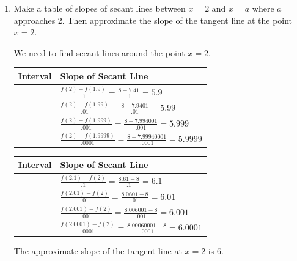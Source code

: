 \documentclass[handout,nooutcomes]{ximera}
\begin{document}
\begin{problem}
\[\begin{array}{lr}
\\

\end{array} \]
	
		\begin{enumerate}
			
		\item  Make a table of slopes of secant lines between $x=2$ and $x=a$ where $a$ approaches 2.  Then approximate the slope of the tangent line at the point $x=2$.
		\begin{freeResponse}		 
		We need to find secant lines around the point $x=2$.
		
			\begin{tabular}{|l|l|}
			\hline
			Interval & Slope of Secant Line  \\
			\hline
			[1.9,2] & $ \frac{f(2)-f(1.9)}{.1}=\frac{8-7.41}{.1}=5.9$  \\
			\hline
			[1.99,2] & $\frac{f(2)-f(1.99)}{.01}=\frac{8-7.9401}{.01}=5.99$  \\
			\hline
			[1.999,2] & $\frac{f(2)-f(1.999)}{.001}=\frac{8-7.994001}{.001}=5.999$  \\
			\hline
			[1.9999,2] & $\frac{f(2)-f(1.9999)}{.0001}=\frac{8-7.99940001}{.0001}=5.9999$  \\
			\hline
			\end{tabular}
			
			\begin{tabular}{|l|l|}
			\hline
			Interval & Slope of Secant Line  \\
			\hline
			[2,2.1] & $ \frac{f(2.1)-f(2)}{.1}=\frac{8.61-8}{.1}=6.1$  \\
			\hline
			[2,2.01] & $\frac{f(2.01)-f(2)}{.01}=\frac{8.0601-8}{.01}=6.01$  \\
			\hline
			[2,2.001] & $\frac{f(2.001)-f(2)}{.001}=\frac{8.006001-8}{.001}=6.001$  \\
			\hline
			[2,2.0001] & $\frac{f(2.0001)-f(2)}{.0001}=\frac{8.00060001-8}{.0001}=6.0001$  \\
			\hline
			\end{tabular}
			
		The approximate slope of the tangent line at $x=2$ is 6.
		\end{freeResponse}
			  

\end{enumerate}
\end{problem}
\end{document}
